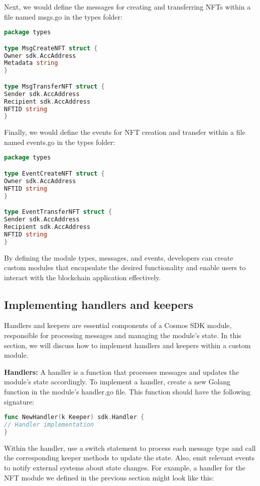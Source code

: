 \documentclass{article}
\begin{document}
Next, we would define the messages for creating and transferring NFTs within a file named msgs.go in the types folder:

\begin{lstlisting}[language=Go]
package types

type MsgCreateNFT struct {
Owner sdk.AccAddress
Metadata string
}

type MsgTransferNFT struct {
Sender sdk.AccAddress
Recipient sdk.AccAddress
NFTID string
}
\end{lstlisting}

Finally, we would define the events for NFT creation and transfer within a file named events.go in the types folder:

\begin{lstlisting}[language=Go]
package types

type EventCreateNFT struct {
Owner sdk.AccAddress
NFTID string
}

type EventTransferNFT struct {
Sender sdk.AccAddress
Recipient sdk.AccAddress
NFTID string
}
\end{lstlisting}

By defining the module types, messages, and events, developers can create custom modules that encapsulate the desired functionality and enable users to interact with the blockchain application effectively.
\subsection{Implementing handlers and keepers}

Handlers and keepers are essential components of a Cosmos SDK module, responsible for processing messages and managing the module's state. In this section, we will discuss how to implement handlers and keepers within a custom module.

\textbf{Handlers:} A handler is a function that processes messages and updates the module's state accordingly. To implement a handler, create a new Golang function in the module's handler.go file. This function should have the following signature:

\begin{lstlisting}[language=Go]
func NewHandler(k Keeper) sdk.Handler {
// Handler implementation
}
\end{lstlisting}

Within the handler, use a switch statement to process each message type and call the corresponding keeper methods to update the state. Also, emit relevant events to notify external systems about state changes. For example, a handler for the NFT module we defined in the previous section might look like this:
\end{document}
